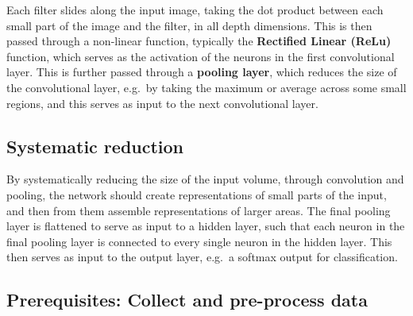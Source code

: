 \documentclass[%
oneside,                 %
final,                   %
10pt]{article}
\begin{document}
Each filter slides along the input image, taking the dot product
between each small part of the image and the filter, in all depth
dimensions. This is then passed through a non-linear function,
typically the \textbf{Rectified Linear (ReLu)} function, which serves as the
activation of the neurons in the first convolutional layer. This is
further passed through a \textbf{pooling layer}, which reduces the size of the
convolutional layer, e.g.~by taking the maximum or average across some
small regions, and this serves as input to the next convolutional
layer.

\subsection*{Systematic reduction}

By systematically reducing the size of the input volume, through
convolution and pooling, the network should create representations of
small parts of the input, and then from them assemble representations
of larger areas.  The final pooling layer is flattened to serve as
input to a hidden layer, such that each neuron in the final pooling
layer is connected to every single neuron in the hidden layer. This
then serves as input to the output layer, e.g.~a softmax output for
classification.


\subsection*{Prerequisites: Collect and pre-process data}
\end{document}
